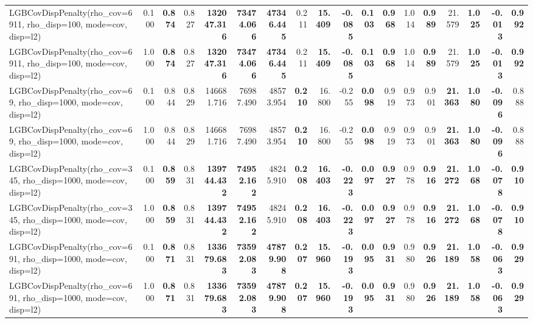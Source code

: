 \documentclass[11pt]{article}
\theoremstyle{plain}
\theoremstyle{definition}
\newcommand{\1}{\mathbf{1}}
\begin{document}
\begin{table}[htbp]
{\begin{tabular}{lrrrrrrrrrrrrrrrrr}
LGBCovDispPenalty(rho_cov=6911, rho_disp=100, mode=cov, disp=l2) & 0.100 & \textbf{0.874} & 0.827 & \textbf{132047.316} & \textbf{73474.066} & \textbf{47346.445} & 0.211 & \textbf{15.409} & \textbf{-0.085} & \textbf{0.103} & \textbf{0.968} & 1.014 & \textbf{0.989} & 21.579 & \textbf{1.025} & \textbf{-0.013} & \textbf{0.992} \\
LGBCovDispPenalty(rho_cov=6911, rho_disp=100, mode=cov, disp=l2) & 1.000 & \textbf{0.874} & 0.827 & \textbf{132047.316} & \textbf{73474.066} & \textbf{47346.445} & 0.211 & \textbf{15.409} & \textbf{-0.085} & \textbf{0.103} & \textbf{0.968} & 1.014 & \textbf{0.989} & 21.579 & \textbf{1.025} & \textbf{-0.013} & \textbf{0.992} \\
LGBCovDispPenalty(rho_cov=69, rho_disp=1000, mode=cov, disp=l2) & 0.100 & 0.844 & 0.829 & 146681.716 & 76987.490 & 48573.954 & \textbf{0.210} & 16.800 & -0.255 & \textbf{0.098} & 0.919 & 0.973 & 0.901 & \textbf{21.363} & \textbf{1.080} & \textbf{-0.096} & 0.888 \\
LGBCovDispPenalty(rho_cov=69, rho_disp=1000, mode=cov, disp=l2) & 1.000 & 0.844 & 0.829 & 146681.716 & 76987.490 & 48573.954 & \textbf{0.210} & 16.800 & -0.255 & \textbf{0.098} & 0.919 & 0.973 & 0.901 & \textbf{21.363} & \textbf{1.080} & \textbf{-0.096} & 0.888 \\
LGBCovDispPenalty(rho_cov=345, rho_disp=1000, mode=cov, disp=l2) & 0.100 & \textbf{0.859} & 0.831 & \textbf{139744.432} & \textbf{74952.162} & 48245.910 & \textbf{0.208} & \textbf{16.403} & \textbf{-0.223} & \textbf{0.097} & \textbf{0.927} & 0.978 & \textbf{0.916} & \textbf{21.272} & \textbf{1.068} & \textbf{-0.078} & \textbf{0.910} \\
LGBCovDispPenalty(rho_cov=345, rho_disp=1000, mode=cov, disp=l2) & 1.000 & \textbf{0.859} & 0.831 & \textbf{139744.432} & \textbf{74952.162} & 48245.910 & \textbf{0.208} & \textbf{16.403} & \textbf{-0.223} & \textbf{0.097} & \textbf{0.927} & 0.978 & \textbf{0.916} & \textbf{21.272} & \textbf{1.068} & \textbf{-0.078} & \textbf{0.910} \\
LGBCovDispPenalty(rho_cov=691, rho_disp=1000, mode=cov, disp=l2) & 0.100 & \textbf{0.871} & 0.831 & \textbf{133679.683} & \textbf{73592.083} & \textbf{47879.908} & \textbf{0.207} & \textbf{15.960} & \textbf{-0.193} & \textbf{0.095} & \textbf{0.931} & 0.980 & \textbf{0.926} & \textbf{21.189} & \textbf{1.058} & \textbf{-0.063} & \textbf{0.929} \\
LGBCovDispPenalty(rho_cov=691, rho_disp=1000, mode=cov, disp=l2) & 1.000 & \textbf{0.871} & 0.831 & \textbf{133679.683} & \textbf{73592.083} & \textbf{47879.908} & \textbf{0.207} & \textbf{15.960} & \textbf{-0.193} & \textbf{0.095} & \textbf{0.931} & 0.980 & \textbf{0.926} & \textbf{21.189} & \textbf{1.058} & \textbf{-0.063} & \textbf{0.929} \\

\end{tabular}}
\end{table}
\end{document}
